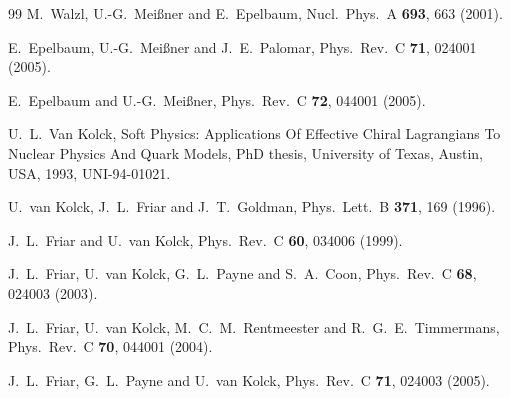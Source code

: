 \documentclass[aps,rmp,nofootinbib,twocolumn,floatfix]{revtex4}
\begin{document}
\begin{thebibliography}{99}
  M.~Walzl, U.-G.~Mei\ss ner and E.~Epelbaum,
  Nucl.\ Phys.\  A {\bf 693}, 663 (2001).

  E.~Epelbaum, U.-G.~Mei\ss ner and J.~E.~Palomar,
  Phys.\ Rev.\  C {\bf 71}, 024001 (2005).

  E.~Epelbaum and U.-G.~Mei\ss ner,
  Phys.\ Rev.\  C {\bf 72}, 044001 (2005).

  U.~L.~Van Kolck,
  Soft Physics: Applications Of Effective Chiral Lagrangians To Nuclear
  Physics And Quark Models, PhD thesis, University of Texas, Austin, USA,
  1993, UNI-94-01021.

  U.~van Kolck, J.~L.~Friar and J.~T.~Goldman,
  Phys.\ Lett.\  B {\bf 371}, 169 (1996).

  J.~L.~Friar and U.~van Kolck,
  Phys.\ Rev.\  C {\bf 60}, 034006 (1999).

  J.~L.~Friar, U.~van Kolck, G.~L.~Payne and S.~A.~Coon,
  Phys.\ Rev.\  C {\bf 68}, 024003 (2003).

  J.~L.~Friar, U.~van Kolck, M.~C.~M.~Rentmeester and R.~G.~E.~Timmermans,
  Phys.\ Rev.\  C {\bf 70}, 044001 (2004).

  J.~L.~Friar, G.~L.~Payne and U.~van Kolck,
  Phys.\ Rev.\  C {\bf 71}, 024003 (2005).


\end{thebibliography}
\end{document}
